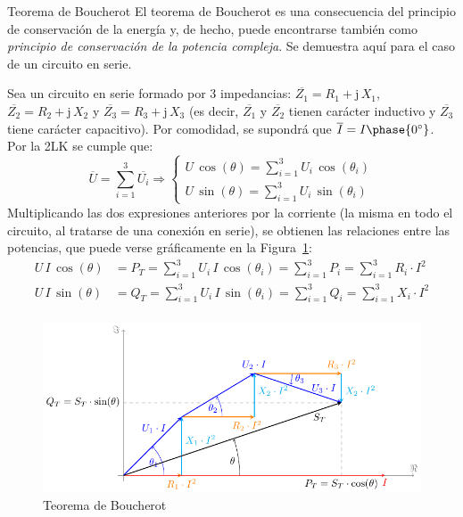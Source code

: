 \documentclass[11pt]{book} %
\makeatletter
\numberwithin{dummy}{section}
\theoremstyle{ocrenumbox}
\theoremstyle{blacknumex}
\theoremstyle{blacknumbox}
\theoremstyle{ocrenum}
\renewcommand{\subsection}{\@startsection {subsection}{2}{\z@}
{-3ex \@plus -0.1ex \@minus -.4ex}
{0.5ex \@plus.2ex }
{\normalfont\sffamily\bfseries}}
\makeatother
\begin{document}
	\subsection{Teorema de Boucherot}\label{sec.boucherot}
	El teorema de Boucherot es una consecuencia del principio de conservación de la energía y, de hecho, puede encontrarse también como \textit{principio de conservación de la potencia compleja}. Se demuestra aquí para el caso de un circuito en serie. 
	
	Sea un circuito en serie formado por 3 impedancias: $\overline{Z_1}=R_1+\mathrm{j}\,X_1$, $\overline{Z_2}=R_2+\mathrm{j}\,X_2$ y $\overline{Z_3}=R_3+\mathrm{j}\,X_3$ (es decir, $\overline{Z_1}$ y $\overline{Z_2}$ tienen carácter inductivo y $\overline{Z_3}$ tiene carácter capacitivo). Por comodidad, se supondrá que $\overline{I}=I\phase{0^\circ}$. Por la 2LK se cumple que:
	\begin{equation*}
		\overline{U}=\sum_{i=1}^3 \overline{U_i}\Rightarrow
		\begin{cases}
			U\,\cos(\theta)=\displaystyle\sum_{i=1}^3 U_i\,\cos(\theta_i)\\
			U\,\sin(\theta)=\displaystyle\sum_{i=1}^3 U_i\,\sin(\theta_i)
		\end{cases}
	\end{equation*}
	Multiplicando las dos expresiones anteriores por la corriente (la misma en todo el circuito, al tratarse de una conexión en serie), se obtienen las relaciones entre las potencias, que puede verse gráficamente en la Figura~\ref{fig.boucherot}: 
	\begin{align*}
		U\,I\,\cos(\theta)&=P_T=\displaystyle\sum_{i=1}^3 U_i\,I\,\cos(\theta_i)=\displaystyle\sum_{i=1}^3 P_i=\displaystyle\sum_{i=1}^3 R_i\cdot I^2\\
		U\,I\,\sin(\theta)&=Q_T=\displaystyle\sum_{i=1}^3 U_i\,I\,\sin(\theta_i)=\displaystyle\sum_{i=1}^3 Q_i=\displaystyle\sum_{i=1}^3 X_i\cdot I^2\\
	\end{align*}
	\begin{figure}[htbp]
		\centering
		\includegraphics{../figs/boucherot.pdf}
		\caption{Teorema de Boucherot}
		\label{fig.boucherot}
	\end{figure}
	
\end{document}
